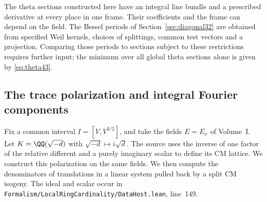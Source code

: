 \documentclass[a4paper,11pt]{article}
\theoremstyle{definition}
\theoremstyle{remark}
\newcommand{\srcloc}[2]{{\small\nolinkurl{#1.lean}}, line~#2}
\numberwithin{equation}{section}
\begin{document}
The theta sections constructed here have an integral line bundle and a prescribed derivative at every place in one frame. Their coefficients and the frame can depend on the field. The Bessel periods of Section~\ref{sec:diagonal32} are obtained from specified Weil kernels, choices of splittings, common test vectors and a projection. Comparing those periods to sections subject to these restrictions requires further input; the minimum over all global theta sections alone is given by \eqref{eq:theta43}.

\subsection{The trace polarization and integral Fourier components}\label{nav:V-07}
\label{sec:pol49}

Fix a common interval \(I=[V,V^{3/2}]\), and take the fields \(E=E_x\)
of Volume~I. Let \(K=\QQ(\sqrt{-d})\) with \(\sqrt{-d}\mapsto i\sqrt d\).
The source uses the inverse of one factor of the relative different
and a purely imaginary scalar to define its CM lattice. We construct
this polarization on the same fields. We then compute the denominators
of translations in a linear system pulled back by a split CM isogeny.
The ideal and scalar occur in
\srcloc{Formalism/LocalRingCardinality/DataHost}{149}.
\end{document}
